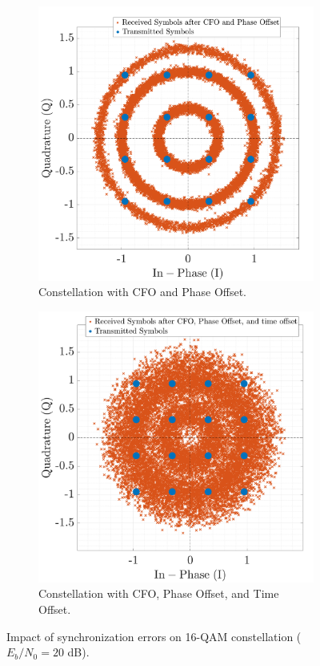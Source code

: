 \documentclass[11pt]{article}
\begin{document}
			\begin{figure}[H]
				\centering
				\begin{subfigure}[b]{0.48\textwidth}
					\centering
					\includegraphics[width=\linewidth]{Images/cfo-po}
					\caption{Constellation with CFO and Phase Offset.}
					\label{fig:cfo-po-sub_compact}
				\end{subfigure}
				\hfill  
				\begin{subfigure}[b]{0.48\textwidth}
					\centering
					\includegraphics[width=\linewidth]{Images/cfo-po-to}
					\caption{Constellation with CFO, Phase Offset, and Time Offset.}
					\label{fig:cfo-po-to-sub_compact}
				\end{subfigure}
				\caption{Impact of synchronization errors on 16-QAM constellation ($E_b/N_0 = 20$ dB).}
				\label{fig:const_sync_errors}
			\end{figure}
			
\end{document}
